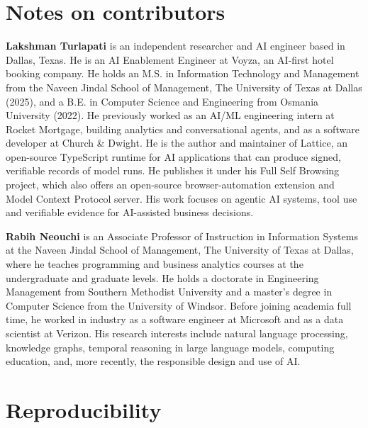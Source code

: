 \documentclass[11pt]{article}
\begin{document}
\section*{Notes on contributors}
\noindent\textbf{Lakshman Turlapati} is an independent researcher and AI engineer based in Dallas, Texas. He is an AI Enablement Engineer at Voyza, an AI-first hotel booking company. He holds an M.S. in Information Technology and Management from the Naveen Jindal School of Management, The University of Texas at Dallas (2025), and a B.E. in Computer Science and Engineering from Osmania University (2022). He previously worked as an AI/ML engineering intern at Rocket Mortgage, building analytics and conversational agents, and as a software developer at Church \& Dwight. He is the author and maintainer of Lattice, an open-source TypeScript runtime for AI applications that can produce signed, verifiable records of model runs. He publishes it under his Full Self Browsing project, which also offers an open-source browser-automation extension and Model Context Protocol server. His work focuses on agentic AI systems, tool use and verifiable evidence for AI-assisted business decisions.

\medskip
\noindent\textbf{Rabih Neouchi} is an Associate Professor of Instruction in Information Systems at the Naveen Jindal School of Management, The University of Texas at Dallas, where he teaches programming and business analytics courses at the undergraduate and graduate levels. He holds a doctorate in Engineering Management from Southern Methodist University and a master's degree in Computer Science from the University of Windsor. Before joining academia full time, he worked in industry as a software engineer at Microsoft and as a data scientist at Verizon. His research interests include natural language processing, knowledge graphs, temporal reasoning in large language models, computing education, and, more recently, the responsible design and use of AI.

\appendix
\section{Reproducibility}
\label{app:repro}


\FloatBarrier
\end{document}
